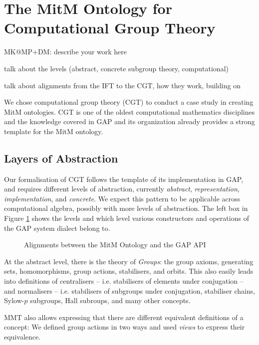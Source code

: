 \section{The MitM Ontology for Computational Group Theory}\label{sec:cgt}
\begin{todolist}{MK@MP+DM: describe your work here}
\item talk about the levels (abstract, concrete subgroup theory, computational)
\item talk about alignments from the IFT to the CGT, how they work, building
  on~\cite{MueRoYuRa:abtafs17,MueGauKal:cacfms17} 
\end{todolist}

We chose computational group theory (CGT) to conduct a case study in creating MitM
ontologies. CGT is one of the oldest computational mathematics disciplines and the
knowledge covered in GAP and its organization already provides a strong template for the
MitM ontology.

\subsection{Layers of Abstraction}

Our formalisation of CGT follows the template of its implementation in GAP, and requires
different levels of abstraction, currently \emph{abstract}, \emph{representation},
\emph{implementation}, and \emph{concrete}.  We expect this pattern to be applicable
across computational algebra, possibly with more levels of abstraction. The left box in
Figure \ref{fig:cgtontology} shows the levels and which level various constructors and
operations of the GAP system dialect belong to. 

\begin{figure}[ht]\centering
  \caption{Alignments between the MitM Ontology and the GAP API}\label{fig:cgtontology}
\end{figure}

At the abstract level, there is the theory of \emph{Groups}: the group axioms, generating
sets, homomorphisms, group actions, stabilisers, and orbits. This also easily leads into
definitions of centralisers -- i.e. stabilisers of elements under conjugation -- and
normalisers -- i.e. stabilisers of subgroups under conjugation, stabiliser chains,
Sylow-$p$ subgroups, Hall subroups, and many other concepts.

MMT also allows expressing that there are different equivalent definitions of a
concept: We defined group actions in two ways and used \emph{views} to express
their equivalence.

